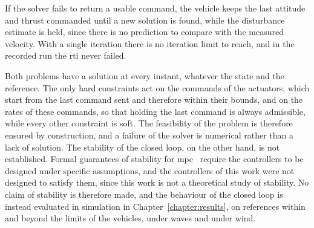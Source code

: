 If the solver fails to return a usable command, the vehicle keeps the last attitude and thrust commanded until a new solution is found, while the disturbance estimate is held, since there is no prediction to compare with the measured velocity. With a single iteration there is no iteration limit to reach, and in the recorded run the \gls{rti} never failed.

Both problems have a solution at every instant, whatever the state and the reference. The only hard constraints act on the commands of the actuators, which start from the last command sent and therefore within their bounds, and on the rates of these commands, so that holding the last command is always admissible, while every other constraint is soft. The feasibility of the problem is therefore ensured by construction, and a failure of the solver is numerical rather than a lack of solution. The stability of the closed loop, on the other hand, is not established. Formal guarantees of stability for \gls{mpc}~\cite{mayneConstrainedModelPredictive2000,rawlingsModelPredictiveControl2020} require the controllers to be designed under specific assumptions, and the controllers of this work were not designed to satisfy them, since this work is not a theoretical study of stability. No claim of stability is therefore made, and the behaviour of the closed loop is instead evaluated in simulation in Chapter~\ref{chapter:results}, on references within and beyond the limits of the vehicles, under waves and under wind.
